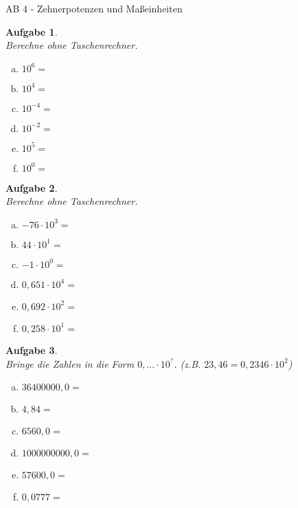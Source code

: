 \documentclass[12pt,fleqn]{article}
\theoremstyle{aufg}
\newtheorem{aufgabe}{Aufgabe}
\theoremstyle{bsp}
\begin{document}
 
    \begin{flushleft}
\begin{center}AB 4 - Zehnerpotenzen und Ma\ss{}einheiten\end{center}\begin{aufgabe} ~ \\ 
Berechne ohne Taschenrechner. \\ 
\begin{multicols}{3} 
\begin{enumerate}[a)] 
\item 
$10^{6}=$
\item 
$10^{4}=$
\item 
$10^{-4}=$
\item 
$10^{-2}=$
\item 
$10^{5}=$
\item 
$10^{0}=$
\end{enumerate} 
\end{multicols} 
\end{aufgabe} 
\begin{aufgabe} ~ \\ 
Berechne ohne Taschenrechner. \\ 
\begin{multicols}{3} 
\begin{enumerate}[a)] 
\item 
$-76\cdot10^{3}=$
\item 
$44\cdot10^{1}=$
\item 
$-1\cdot10^{0}=$
\item 
$0,651\cdot10^{4}=$
\item 
$0,692\cdot10^{2}=$
\item 
$0,258\cdot10^{1}=$
\end{enumerate} 
\end{multicols} 
\end{aufgabe} 
\begin{aufgabe} ~ \\ 
Bringe die Zahlen in die Form $0,... \cdot 10^{?}$. (z.B. $23,46 = 0,2346 \cdot 10^2$) \\ 
\begin{multicols}{3} 
\begin{enumerate}[a)] 
\item 
$36400000,0=$
\item 
$4,84=$
\item 
$6560,0=$
\item 
$1000000000,0=$
\item 
$57600,0=$
\item 
$0,0777=$
\end{enumerate} 

\end{multicols}
\end{aufgabe}
\end{flushleft}
\end{document}
